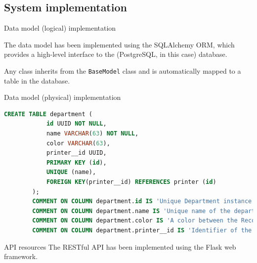 \subsection[System implementation]{System implementation}

\begin{frame}[allowframebreaks]{Data model (logical) implementation}

	The data model has been implemented using the SQLAlchemy ORM, which
	provides a high-level interface to the (PostgreSQL, in this case) database.

	

	Any class inherits from the \texttt{BaseModel} class and is automatically
	mapped to a table in the database.

	\framebreak

	\vspace*{-1\baselineskip}
	

\end{frame}

\begin{frame}[fragile]{Data model (physical) implementation}
	
	\begin{lstlisting}[language=SQL]
		CREATE TABLE department (
			id UUID NOT NULL,
			name VARCHAR(63) NOT NULL,
			color VARCHAR(63),
			printer__id UUID,
			PRIMARY KEY (id),
			UNIQUE (name),
			FOREIGN KEY(printer__id) REFERENCES printer (id)
		);
		COMMENT ON COLUMN department.id IS 'Unique Department instance identifier';
		COMMENT ON COLUMN department.name IS 'Unique name of the department';
		COMMENT ON COLUMN department.color IS 'A color between the Recognized color keyword names. See also https://www.w3.org/TR/SVG11/types.html#ColorKeywords';
		COMMENT ON COLUMN department.printer__id IS 'Identifier of the printer the department is equipped with';\end{lstlisting}

\end{frame}

\begin{frame}{API resources}
	The RESTful API has been implemented using the Flask web framework.

	

	\framebreak

	\vspace*{-1\baselineskip}
	

\end{frame}

